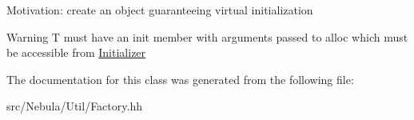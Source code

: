 \begin{DoxyParagraph}{Motivation\-:}
create an object guaranteeing virtual initialization
\end{DoxyParagraph}
\begin{DoxyWarning}{Warning}
{\ttfamily T} must have an {\ttfamily init} member with arguments passed to {\ttfamily alloc} which must be accessible from {\ttfamily \hyperlink{classNeb_1_1Initializer}{Initializer}} 
\end{DoxyWarning}


The documentation for this class was generated from the following file\-:\begin{DoxyCompactItemize}
\item 
src/\-Nebula/\-Util/Factory.\-hh\end{DoxyCompactItemize}
